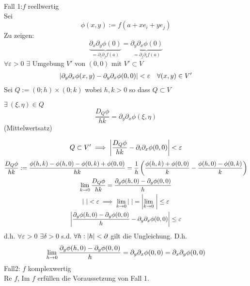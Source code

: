 \begin{Bew}
  Fall 1:$f$ reellwertig\\
  Sei 
  \[\phi(x,y):=f(a+xe_i+ye_j)\]
  Zu zeigen:
  \[\underbrace{\partial_x\partial_y\phi(0)}_{=\partial_i\partial_jf(a)}=\underbrace{\partial_y\partial_x\phi(0)}_{=\partial_j\partial_if(a)}\]
  $\forall \varepsilon >0$ $\exists$ Umgebung $V'$ von $(0,0)$ mit $V'\subset V$
  \begin{align*}
    \left| \partial_y\partial_x\phi(x,y)-\partial_y\partial_x\phi(0,0) \right|<\varepsilon &&\forall (x,y)\in V'
  \end{align*}
  Sei $Q:=\left( 0;h \right)\times\left( 0;k \right)$ wobei $h,k>0$ so dass $Q\subset V$
  \begin{Lem}
    $\exists\ (\xi,\eta)\in Q$
    \[\frac{D_Q\phi}{hk}=\partial_y\partial_x\phi(\xi,\eta)\]
    (Mittelwertsatz)
  \end{Lem}
  \begin{gather*}
    Q\subset V'\implies\left| \frac{D_Q\phi}{hk}-\partial_i\partial_x\phi(0,0) \right|<\varepsilon
  \end{gather*}
  \begin{gather*}
    \frac{D_Q\phi}{hk}:=\frac{\phi(h,k)-\phi(h,0)-\phi(0,k)+\phi(0,0)}{hk}=\frac{1}{h}\left( \frac{ \phi(h,k)+\phi(0,0)}{k}-\frac{\phi(h,0)-\phi(0,k)}{k}\right)\\
    \displaystyle\lim_{k\rightarrow0}\frac{D_Q\phi}{hk}=\frac{\partial_y\phi(h,0)-\partial_y\phi(0,0)}{h}\\
    \left| \  \right|<\varepsilon\implies\displaystyle\lim_{k\rightarrow0}\left| \  \right|=\left| \displaystyle\lim_{k\rightarrow0}\  \right|\leq \varepsilon\\
    \left| \frac{\partial_y\phi(h,0)-\partial_y\phi(0,0)}{h}-\partial_y\partial_x\phi(0,0) \right|\leq \varepsilon
  \end{gather*}
  d.h. $\forall\varepsilon>0$ $\exists \delta>0$ s.d. $\forall h:\left| h \right|<\partial$ gilt die Ungleichung. D.h.
  \[\displaystyle\lim_{h\rightarrow0}\frac{\partial_y\phi(h,0)-\partial_y\phi(0,0)}{h}=\partial_y\partial_x\phi(0,0)=\partial_x\partial_y\phi(0,0)\]
  Fall2: $f$ komplexwertig\\
  Re $f$, Im $f$ erfüllen die Voraussetzung von Fall 1.
\end{Bew}
